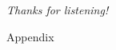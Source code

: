 \documentclass[compress,aspectratio=1610]{beamer}
\begin{document}
\begin{darkframe}[noframenumbering]
  \centering
  \textit{Thanks for listening!}
\end{darkframe}

\appendix
\begin{darkframe}
  \centering
   Appendix
\end{darkframe}
\end{document}
